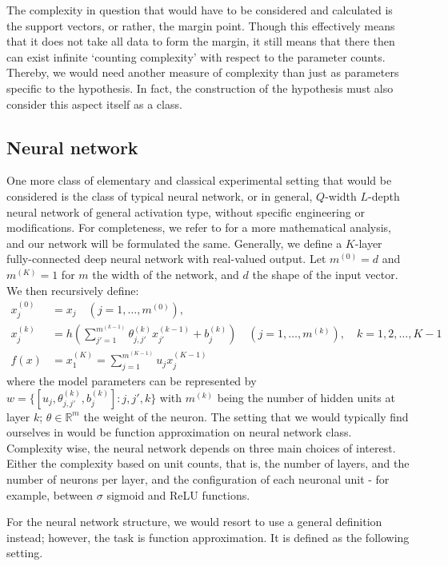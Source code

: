 \documentclass{article}
\begin{document}
The complexity in question that would have to be considered and calculated is the support vectors, or rather, the margin point. Though this effectively means that it does not take all data to form the margin, it still means that there then can exist infinite `counting complexity' with respect to the parameter counts. Thereby, we would need another measure of complexity than just as parameters specific to the hypothesis. In fact, the construction of the hypothesis must also consider this aspect itself as a class. 

\subsection{Neural network}

One more class of elementary and classical experimental setting that would be considered is the class of typical neural network, or in general, $Q$-width $L$-depth neural network of general activation type, without specific engineering or modifications. For completeness, we refer to \cite{zhang2023mathematical} for a more mathematical analysis, and our network will be formulated the same. Generally, we define a $K$-layer fully-connected deep neural network with real-valued output. Let $m^{(0)}=d$ and $m^{(K)}=1$ for $m$ the width of the network, and $d$ the shape of the input vector. We then recursively define: 
\begin{align}
    x_{j}^{(0)} &= x_{j} \quad (j=1,\dots,m^{(0)}),\\ 
    x_{j}^{(k)} &= h\left(\sum^{m^{(k-1)}}_{j'=1} \theta_{j,j'}^{(k)}x_{j'}^{(k-1)}+ b_{j}^{(k)}\right)\quad (j=1,\dots,m^{(k)}), \quad k = 1,2,\dots,K-1\\
    f(x) & = x_{1}^{(K)} = \sum^{m^{(K-1)}}_{j=1} u_{j}x_{j}^{(K-1)}
\end{align}
where the model parameters can be represented by $w=\{[u_{j}, \theta_{j,j'}^{(k)}, b_{j}^{(k)}]: j,j',k\}$ with $m^{(k)}$ being the number of hidden units at layer $k$; $\theta\in \mathbb{R}^{m}$ the weight of the neuron. The setting that we would typically find ourselves in would be function approximation on neural network class. Complexity wise, the neural network depends on three main choices of interest. Either the complexity based on unit counts, that is, the number of layers, and the number of neurons per layer, and the configuration of each neuronal unit - for example, between $\sigma$ sigmoid and ReLU functions. 

For the neural network structure, we would resort to use a general definition instead; however, the task is function approximation. It is defined as the following setting. 
\vspace{2mm}
\end{document}
